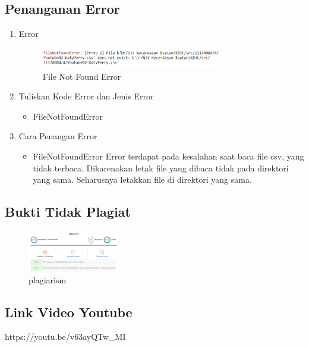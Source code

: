 \subsection{Penanganan Error}
\begin{enumerate}
\item Error
\begin{figure}[H]
    \includegraphics[width=8cm]{figures/1174084/4/error1.png}
    \centering
    \caption{File Not Found Error}
\end{figure}
\item Tuliskan Kode Error dan Jenis Error
	\begin{itemize}
		\item FileNotFoundError
	\end{itemize}
	\item Cara Penangan Error
	\begin{itemize}
		\item FileNotFoundError
		\hfill\break
		Error terdapat pada kesalahan saat baca file csv, yang tidak terbaca. Dikarenakan letak file yang dibaca tidak pada direktori yang sama. Seharusnya letakkan file di direktori yang sama. 
	\end{itemize}
\end{enumerate}

\subsection{Bukti Tidak Plagiat}
\begin{figure}[H]
	\includegraphics[width=4cm]{figures/1174084/4/plagiarism.png}
	\centering
	\caption{plagiarism}
\end{figure}


\subsection{Link Video Youtube}
https://youtu.be/v63ayQTw\_MI
